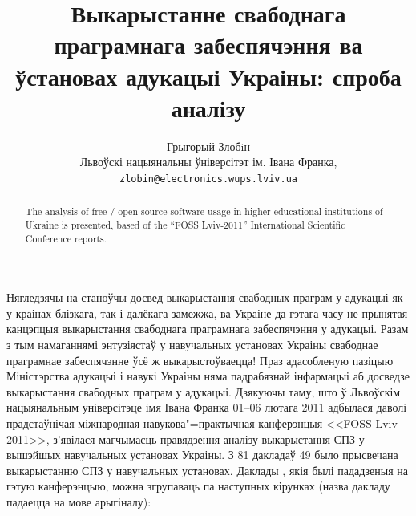 \documentclass[10pt, a5paper]{article}
\begin{document}
\renewcommand{\figurename}{Рыс.} %
\renewcommand{\abstractname}{Анатацыя}
\renewcommand{\refname}{Літаратура}

\title{Выкарыстанне свабоднага праграмнага забеспячэння ва ўстановах адукацыі Украіны: спроба аналізу}

\author{Грыгорый Злобiн\\
\small Львоўскі нацыянальны ўніверсітэт ім. Івана Франка,\\
\small \texttt{zlobin@electronics.wups.lviv.ua}
}
\date{}

\maketitle

\begin{abstract}
The analysis of free / open source software usage in higher educational institutions of Ukraine is presented, based of the ``FOSS Lviv-2011''  International Scientific Conference reports. 
\end{abstract}

Нягледзячы на станоўчы досвед выкарыстання свабодных праграм у адукацыі як у краінах блізкага, так і далёкага замежжа, ва Украіне да гэтага часу не прынятая канцэпцыя выкарыстання свабоднага праграмнага забеспячэння у адукацыі. Разам з тым намаганнямі энтузіястаў у навучальных установах Украіны свабоднае праграмнае забеспячэнне ўсё ж выкарыстоўваецца! Праз адасобленую пазіцыю Міністэрства адукацыі і навукі Украіны няма падрабязнай інфармацыі аб досведзе выкарыстання свабодных праграм у адукацыі. Дзякуючы таму, што ў Львоўскім нацыянальным універсітэце імя Івана Франка 01--06 лютага 2011 адбылася даволі прадстаўнічая міжнародная навукова"=практычная канферэнцыя <<FOSS Lviv-2011>>, з'явілася магчымасць правядзення аналізу выкарыстання СПЗ у вышэйшых навучальных установах Украіны. З 81 дакладаў 49 было прысвечана выкарыстанню СПЗ у навучальных установах. Даклады \cite{fosslviv}, якія былі пададзеныя на гэтую канферэнцыю, можна згрупаваць па наступных кірунках (назва дакладу падаецца на мове арыгіналу):
\end{document}
